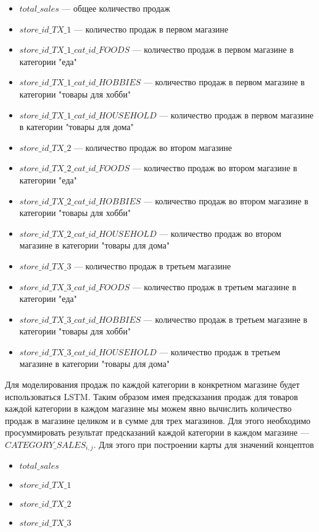 \begin{itemize}
	\item $ total\_sales $ --- общее количество продаж
	\item $ store\_id\_TX\_1 $ --- количество продаж в первом магазине
	\item $ store\_id\_TX\_1\_cat\_id\_FOODS $ --- количество продаж в первом магазине в категории "еда"
	\item $ store\_id\_TX\_1\_cat\_id\_HOBBIES $ --- количество продаж в первом магазине в категории "товары для хобби"
	\item $ store\_id\_TX\_1\_cat\_id\_HOUSEHOLD $ --- количество продаж в первом магазине в категории "товары для дома"
	\item $ store\_id\_TX\_2 $ --- количество продаж во втором магазине
	\item $ store\_id\_TX\_2\_cat\_id\_FOODS $ --- количество продаж во втором магазине в категории "еда"
	\item $ store\_id\_TX\_2\_cat\_id\_HOBBIES $ --- количество продаж во втором магазине в категории "товары для хобби"
	\item $ store\_id\_TX\_2\_cat\_id\_HOUSEHOLD $ --- количество продаж во втором магазине в категории "товары для дома"
	\item $ store\_id\_TX\_3 $ --- количество продаж в третьем магазине
	\item $ store\_id\_TX\_3\_cat\_id\_FOODS $     --- количество продаж в третьем магазине в категории "еда"
	\item $ store\_id\_TX\_3\_cat\_id\_HOBBIES $   --- количество продаж в третьем магазине в категории "товары для хобби"
	\item $ store\_id\_TX\_3\_cat\_id\_HOUSEHOLD $ --- количество продаж в третьем магазине в категории "товары для дома"
\end{itemize}

Для моделирования продаж по каждой категории в конкретном магазине
будет использоваться LSTM.
Таким образом имея предсказания продаж для товаров каждой категории в каждом магазине
мы можем явно вычислить количество продаж в магазине целиком и в сумме для трех магазинов.
Для этого необходимо просуммировать результат предсказаний каждой категории
в каждом магазине --- $ CATEGORY\_SALES_{i,j} $.
Для этого при построении карты для значений концептов

\begin{itemize}
	\item $ total\_sales $
	\item $ store\_id\_TX\_1 $
	\item $ store\_id\_TX\_2 $
	\item $store\_id\_TX\_3$
\end{itemize}

